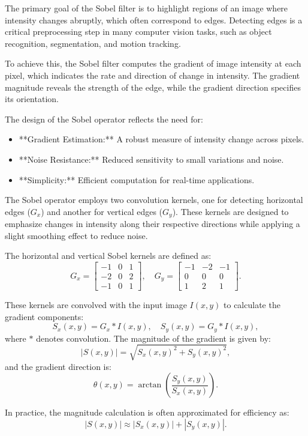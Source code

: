 \documentclass[11pt]{book}
\begin{document}
The primary goal of the Sobel filter is to highlight regions of an image where intensity changes abruptly, which often correspond to edges. Detecting edges is a critical preprocessing step in many computer vision tasks, such as object recognition, segmentation, and motion tracking. 

To achieve this, the Sobel filter computes the gradient of image intensity at each pixel, which indicates the rate and direction of change in intensity. The gradient magnitude reveals the strength of the edge, while the gradient direction specifies its orientation.

The design of the Sobel operator reflects the need for:
\begin{itemize}
    \item **Gradient Estimation:** A robust measure of intensity change across pixels.
    \item **Noise Resistance:** Reduced sensitivity to small variations and noise.
    \item **Simplicity:** Efficient computation for real-time applications.
\end{itemize}

The Sobel operator employs two convolution kernels, one for detecting horizontal edges ($G_x$) and another for vertical edges ($G_y$). These kernels are designed to emphasize changes in intensity along their respective directions while applying a slight smoothing effect to reduce noise. 

The horizontal and vertical Sobel kernels are defined as:
\[
G_x = \begin{bmatrix}
-1 & 0 & 1 \\
-2 & 0 & 2 \\
-1 & 0 & 1
\end{bmatrix}, \quad
G_y = \begin{bmatrix}
-1 & -2 & -1 \\
 0 &  0 &  0 \\
 1 &  2 &  1
\end{bmatrix}.
\]

These kernels are convolved with the input image $I(x, y)$ to calculate the gradient components:
\[
S_x(x, y) = G_x * I(x, y), \quad S_y(x, y) = G_y * I(x, y),
\]
where $*$ denotes convolution. The magnitude of the gradient is given by:
\[
|S(x, y)| = \sqrt{S_x(x, y)^2 + S_y(x, y)^2},
\]
and the gradient direction is:
\[
\theta(x, y) = \arctan\left(\frac{S_y(x, y)}{S_x(x, y)}\right).
\]

In practice, the magnitude calculation is often approximated for efficiency as:
\[
|S(x, y)| \approx |S_x(x, y)| + |S_y(x, y)|.
\]
\end{document}
